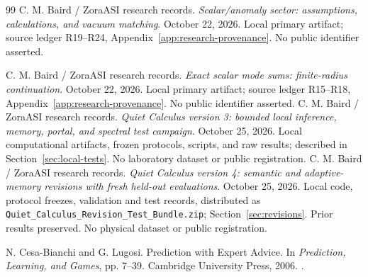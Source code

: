 \begin{thebibliography}{99}
 C. M. Baird / ZoraASI research records. \emph{Scalar/anomaly sector: assumptions, calculations, and vacuum matching}. October 22, 2026. Local primary artifact; source ledger R19--R24, Appendix~\ref{app:research-provenance}. No public identifier asserted.

 C. M. Baird / ZoraASI research records. \emph{Exact scalar mode sums: finite-radius continuation}. October 22, 2026. Local primary artifact; source ledger R15--R18, Appendix~\ref{app:research-provenance}. No public identifier asserted.
 C. M. Baird / ZoraASI research records. \emph{Quiet Calculus version 3: bounded local inference, memory, portal, and spectral test campaign}. October 25, 2026. Local computational artifacts, frozen protocols, scripts, and raw results; described in Section~\ref{sec:local-tests}. No laboratory dataset or public registration.
 C. M. Baird / ZoraASI research records. \emph{Quiet Calculus version 4: semantic and adaptive-memory revisions with fresh held-out evaluations}. October 25, 2026. Local code, protocol freezes, validation and test records, distributed as \texttt{Quiet\_Calculus\_Revision\_Test\_Bundle.zip}; Section~\ref{sec:revisions}. Prior results preserved. No physical dataset or public registration.

 N. Cesa-Bianchi and G. Lugosi. Prediction with Expert Advice. In \emph{Prediction, Learning, and Games}, pp. 7--39. Cambridge University Press, 2006. .
\end{thebibliography}

\normalsize
